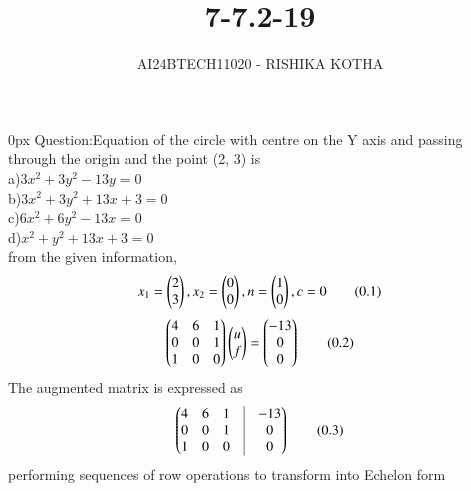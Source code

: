 \documentclass[journal]{IEEEtran}
\begin{document}

\vspace{3cm}

\title{7-7.2-19}
\author{AI24BTECH11020 - RISHIKA KOTHA}
{\let\newpage\relax\maketitle}

\renewcommand{\thefigure}{\theenumi}
\renewcommand{\thetable}{\theenumi}
\setlength{\intextsep}{10pt} %


\renewcommand{\thetable}{\theenumi}
\parindent 0px
Question:Equation of the circle with centre on the Y axis and passing through the origin and the point (2, 3) is
\\
a)$3x^2+3y^2-13y=0$\\
b)$3x^2+3y^2+13x+3=0$\\
c)$6x^2+6y^2-13x=0$\\
d)$x^2+y^2+13x+3=0$\\
\solution
from the given information,
\begin{align*}
	x_1=\begin{pmatrix}2\\3\end{pmatrix}, x_2=\begin{pmatrix}0\\0\end{pmatrix},n=\begin{pmatrix}1\\0\end{pmatrix},c=0 \tag{0.1}
\end{align*}
\begin{align*}
	\begin{pmatrix}4 & 6 & 1 \\
	       0 & 0 & 1 \\
	       1 & 0 & 0\end{pmatrix}
	       \begin{pmatrix}u\\f\end{pmatrix}=\begin{pmatrix}-13\\0\\0\end{pmatrix}\tag{0.2}
\end{align*}
The augmented matrix is expressed as
\begin{align*}
	\myvec{4 & 6 & 1 & \vrule & -13\\
         0 &  0 & 1 & \vrule & 0\\
	 1 &  0 & 0 & \vrule & 0} \tag{0.3}
\end{align*}
performing sequences of row operations to transform into Echelon form
\end{document}
